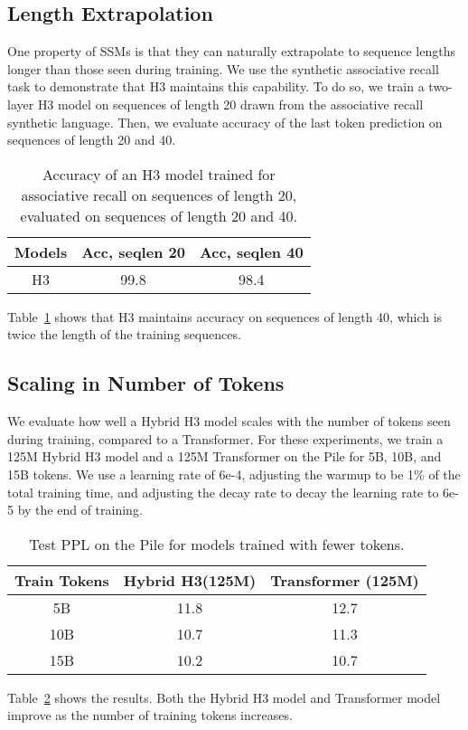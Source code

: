 \documentclass{article}
\newcommand{\hthree}{\textsc{H3}\xspace}
\begin{document}
\subsection{Length Extrapolation}
One property of SSMs is that they can naturally extrapolate to sequence lengths longer than those seen during training.
We use the synthetic associative recall task to demonstrate that \hthree maintains this capability.
To do so, we train a two-layer \hthree model on sequences of length 20 drawn from the associative recall synthetic language.
Then, we evaluate accuracy of the last token prediction on sequences of length 20 and 40.

\begin{table}[h]
\caption{\label{table:length_extrapolation} Accuracy of an \hthree model trained for associative recall on sequences of length 20, evaluated on sequences of length 20 and 40.}
\centering
\small
\begin{tabular}{|c|cc|}
\hline
Models & Acc, seqlen 20 & Acc, seqlen 40 \\
\hline
\hthree & 99.8 & 98.4 \\ \hline
\end{tabular}
\end{table} 
Table~\ref{table:length_extrapolation} shows that \hthree maintains accuracy on sequences of length 40, which is twice the length of the training sequences.

\subsection{Scaling in Number of Tokens}
We evaluate how well a Hybrid \hthree model scales with the number of tokens seen during training, compared to a Transformer.
For these experiments, we train a 125M Hybrid \hthree model and a 125M Transformer on the Pile for 5B, 10B, and 15B tokens.
We use a learning rate of 6e-4, adjusting the warmup to be 1\% of the total training time, and adjusting the decay rate to decay the learning rate to 6e-5 by the end of training.

\begin{table}[h]
\caption{\label{table:scaling_tokens} Test PPL on the Pile for models trained with fewer tokens.}
\centering
\small
\begin{tabular}{|c|cc|}
\hline
Train Tokens & Hybrid \hthree (125M) & Transformer (125M) \\
\hline
5B & 11.8 & 12.7 \\
10B & 10.7 & 11.3 \\
15B & 10.2 & 10.7 \\
\hline
\end{tabular}
\end{table} 
Table~\ref{table:scaling_tokens} shows the results.
Both the Hybrid \hthree model and Transformer model improve as the number of training tokens increases.
\end{document}
